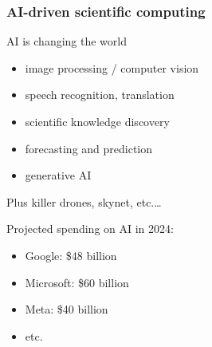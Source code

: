\documentclass[
    xcolor={svgnames,dvipsnames},
    hyperref={colorlinks, citecolor=DeepPink4, linkcolor=DarkRed, urlcolor=DarkBlue}
    ]{beamer}  %
\newcommand{\1}{\mathbbm 1}
\begin{document}
\begin{frame}
    \frametitle{AI-driven scientific computing}

    AI is changing the world

    \begin{itemize}
        \item image processing / computer vision
        \vspace{0.5em}
        \item speech recognition, translation
        \vspace{0.5em}
        \item scientific knowledge discovery
        \vspace{0.5em}
        \item forecasting and prediction 
        \vspace{0.5em}
        \item generative AI
    \end{itemize}

    \pause

        \vspace{0.5em}
        \vspace{0.5em}
        \vspace{0.5em}
    Plus killer drones, skynet, etc.\ldots

    
\end{frame}

\begin{frame}
    
    Projected spending on AI in 2024:

    \begin{itemize}
        \item Google: \$48 billion
        \vspace{0.5em}
        \item Microsoft: \$60 billion
        \vspace{0.5em}
        \item Meta: \$40 billion
        \vspace{0.5em}
        \item etc.
    \end{itemize}

\end{frame}
\end{document}
